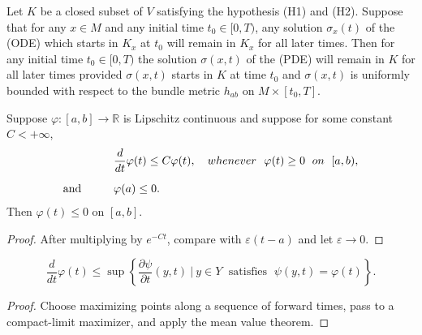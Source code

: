 \begin{theorem}
  \label{thm:cz-advanced-maximum-principle-for-time-dependent-tensors}
 Let $K$ be a closed subset of $V$ satisfying the
hypothesis {\rm (H1)} and {\rm (H2)}. Suppose that for any $x\in
M$ and any initial time $t_0\in[0,T)$, any solution $\sigma_x(t)$
of the {\rm (ODE)} which starts in $K_x$ at $t_0$ will remain in
$K_x$ for all later times. Then for any initial time $t_0\in
[0,T)$ the solution $\sigma(x,t)$ of the {\rm (PDE)} will remain
in $K$ for all later times provided $\sigma(x,t)$ starts in $K$ at
time $t_0$ and $\sigma(x,t)$ is uniformly bounded with respect to
the bundle metric $h_{ab}$ on $M\times[t_0,T]$.
\end{theorem}

\begin{lemma}
  \label{lem:cz-vanishing-from-a-lipschitz-differential-inequality}
Suppose $\varphi: [a,b]\rightarrow \mathbb{R}$ is Lipschitz
continuous and suppose for some constant $C<+\infty$,
\begin{align*}
&  \frac{d}{dt}\varphi(t)\le C\varphi(t),\quad whenever\ \
\varphi(t)\ge 0\;\ on\ \;[a,b),\\[2mm]
\text{and}\hskip 1cm &  \varphi(a)\le 0.
\end{align*}
Then $\varphi(t)\le 0$ on $[a,b]$.
\end{lemma}

\begin{proof}
  \sketch After multiplying by $e^{-Ct}$, compare with $\varepsilon(t-a)$ and let $\varepsilon\to0$.
\end{proof}

\begin{lemma}
  \label{lem:cz-derivative-of-a-fiberwise-supremum}
$$
\frac{d}{dt}\varphi(t) \le \sup\left\{\frac{\partial
\psi}{\partial t}(y,t)\ |\ y\in Y \; \mbox{ satisfies }\;
\psi(y,t)=\varphi(t)\right\}.
$$
\end{lemma}

\begin{proof}
  \sketch Choose maximizing points along a sequence of forward times, pass to a compact-limit maximizer, and apply the mean value theorem.
\end{proof}

